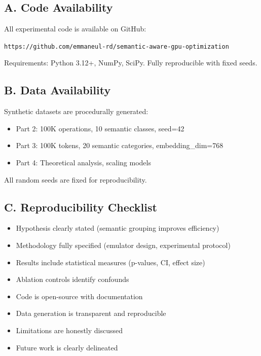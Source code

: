 \documentclass[11pt,twocolumn]{article}
\begin{document}
\subsection*{A. Code Availability}

All experimental code is available on GitHub:
\begin{center}
\texttt{https://github.com/emmaneul-rd/semantic-aware-gpu-optimization}
\end{center}

\noindent
Requirements: Python 3.12+, NumPy, SciPy. Fully reproducible with fixed seeds.

\subsection*{B. Data Availability}

Synthetic datasets are procedurally generated:
\begin{itemize}
\item Part 2: 100K operations, 10 semantic classes, seed=42
\item Part 3: 100K tokens, 20 semantic categories, embedding\_dim=768
\item Part 4: Theoretical analysis, scaling models
\end{itemize}

All random seeds are fixed for reproducibility.

\subsection*{C. Reproducibility Checklist}

\begin{itemize}
\item[\checkmark] Hypothesis clearly stated (semantic grouping improves efficiency)
\item[\checkmark] Methodology fully specified (emulator design, experimental protocol)
\item[\checkmark] Results include statistical measures (p-values, CI, effect size)
\item[\checkmark] Ablation controls identify confounds
\item[\checkmark] Code is open-source with documentation
\item[\checkmark] Data generation is transparent and reproducible
\item[\checkmark] Limitations are honestly discussed
\item[\checkmark] Future work is clearly delineated
\end{itemize}
\end{document}
